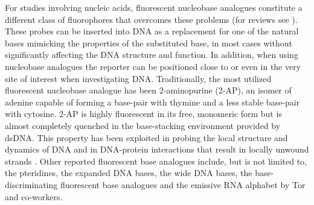  For studies involving nucleic acids, fluorescent nucleobase analogues constitute a different class of fluorophores that overcomes these problems (for reviews see \cite{Wilhelmsson2010,Sinkeldam2010,Rist2002,Hawkins2003,Okamoto2005,Wilson2006,Asseline2006,Loakes2007}). These probes can be inserted into DNA as a replacement for one of the natural bases mimicking the properties of the substituted base, in most cases without significantly affecting the DNA structure and function. In addition, when using nucleobase analogues the reporter can be positioned close to or even in the very site of interest when investigating DNA. Traditionally, the most utilized fluorescent nucleobase analogue has been 2-aminopurine (2-AP), an isomer of adenine capable of forming a base-pair with thymine and a less stable base-pair with cytosine.\cite{Freese1959} 2-AP is highly fluorescent in its free, monomeric form but is almost completely quenched in the base-stacking environment provided by dsDNA.\cite{Ward1969} This property has been exploited in probing the local structure and dynamics of DNA \cite{Guest1991,Xu1994,Millar1996} and in DNA-protein interactions that result in locally unwound strands \cite{Millar1996,Hochstrasser1994,Raney1994}. Other reported fluorescent base analogues include, but is not limited to, the pteridines\cite{Hawkins2001}, the expanded DNA bases\cite{Liu2004}, the wide DNA bases\cite{Lu2004}, the base-discriminating fluorescent base analogues\cite{Okamoto2003,Okamoto2003a,Okamoto2003b,Okamoto2005} and the emissive RNA alphabet by Tor and co-workers\cite{Shin2011}.

